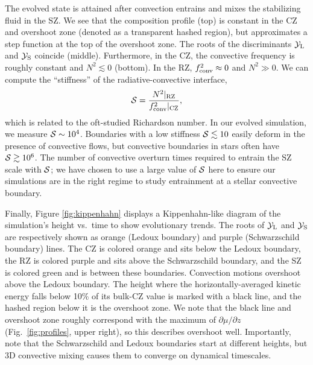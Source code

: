 The evolved state is attained after convection entrains and mixes the stabilizing fluid in the SZ.
We see that the composition profile (top) is constant in the CZ and overshoot zone (denoted as a transparent hashed region), but approximates a step function at the top of the overshoot zone.
The roots of the discriminants $\mathcal{Y}_{\rm{L}}$ and $\mathcal{Y}_{\rm{S}}$ coincide (middle).
Furthermore, in the CZ, the convective frequency is roughly constant and $N^2 \lesssim 0$ (bottom).
In the RZ, $f_{\rm{conv}}^2 \approx 0$ and $N^2 \gg 0$.
We can compute the ``stiffness'' of the radiative-convective interface,
\begin{equation}
\mS = \frac{N^2|_{\rm{RZ}}}{f_{\rm{conv}}^2|_{\rm{CZ}}},
\label{eqn:stiffness}
\end{equation}
which is related to the oft-studied Richardson number.
In our evolved simulation, we measure $\mathcal{S} \sim 10^{4}$.
Boundaries with a low stiffness $\mathcal{S} \lesssim 10$ easily deform in the presence of convective flows, but convective boundaries in stars often have $\mathcal{S} \gtrsim 10^6$.
The number of convective overturn times required to entrain the SZ scale with $\mathcal{S}$; we have chosen to use a large value of $\mathcal{S}$ here to ensure our simulations are in the right regime to study entrainment at a stellar convective boundary.

Finally, Figure \ref{fig:kippenhahn} displays a Kippenhahn-like diagram of the simulation's height vs.~time to show evolutionary trends.
The roots of $\mathcal{Y}_{\rm{L}}$ and $\mathcal{Y}_{\rm{S}}$ are respectively shown as orange (Ledoux boundary) and purple (Schwarzschild boundary) lines.
The CZ is colored orange and sits below the Ledoux boundary, the RZ is colored purple and sits above the Schwarzschild boundary, and the SZ is colored green and is between these boundaries.
Convection motions overshoot above the Ledoux boundary.
The height where the horizontally-averaged kinetic energy falls below 10\% of its bulk-CZ value is marked with a black line, and the hashed region below it is the overshoot zone.
We note that the black line and overshoot zone roughly correspond with the maximum of $\partial\mu/\partial z$ (Fig.~\ref{fig:profiles}, upper right), so this describes overshoot well.
Importantly, note that the Schwarzschild and Ledoux boundaries start at different heights, but 3D convective mixing causes them to converge on dynamical timescales.


